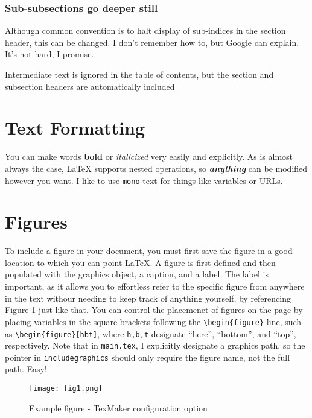 \subsubsection{Sub-subsections go deeper still}

Although common convention is to halt display of sub-indices in the section header, this can be changed. 
I don't remember how to, but Google can explain. 
It's not hard, I promise.

Intermediate text is ignored in the table of contents, but the section and subsection headers are automatically included

\section{Text Formatting}

You can make words \textbf{bold} or \textit{italicized} very easily and explicitly.
As is almost always the case, LaTeX supports nested operations, so \textbf{\textit{anything}} can be modified however you want.
I like to use \texttt{mono} text for things like variables or URLs.

\section{Figures}

To include a figure in your document, you must first save the figure in a good location to which you can point LaTeX.
A figure is first defined and then populated with the graphics object, a caption, and a label.
The label is important, as it allows you to effortless refer to the specific figure from anywhere in the text withour needing to keep track of anything yourself, by referencing Figure \ref{fig:fig1} just like that.
You can control the placemenet of figures on the page by placing variables in the square brackets following the \texttt{\textbackslash begin\{figure\}} line, such as  \texttt{\textbackslash begin\{figure\}[hbt]}, where \texttt{h,b,t} designate ``here'', ``bottom'', and ``top'', respectively.
Note that in \texttt{main.tex}, I explicitly designate a graphics path, so the pointer in \texttt{includegraphics} should only require the figure name, not the full path.
Easy!

\begin{figure}[t]
\center
\texttt{[image: fig1.png]}
\caption{Example figure - TexMaker configuration option}
\label{fig:fig1}
\end{figure}

